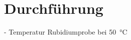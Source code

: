 \newpage
\section{Durchführung}
\label{sec:Durchführung}

- Temperatur Rubidiumprobe bei \SI{50}{\celsius}

